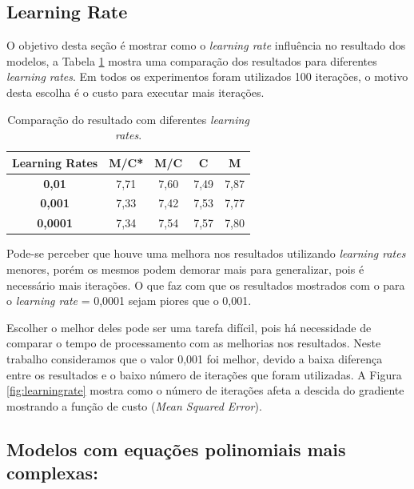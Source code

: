 \documentclass[conference]{IEEEtran}
\begin{document}
\subsection{Learning Rate}

O objetivo desta seção é mostrar como o \emph{learning rate} influência no resultado dos modelos, a Tabela \ref{tab:rates} mostra uma comparação dos resultados para diferentes \emph{learning rates}. Em todos os experimentos foram utilizados 100 iterações, o motivo desta escolha é o custo para executar mais iterações.

\begin{table}[!h]
	\centering
	
	\begin{tabular}{ccccc} \\ \hline
		\textbf{Learning Rates} & \textbf{M/C*} & \textbf{M/C} & \textbf{C} & \textbf{M} \\ \hline
		\textbf{0,01}   & 7,71          & 7,60         & 7,49       & 7,87       \\
		\textbf{0,001}  & 7,33          & 7,42         & 7,53       & 7,77       \\
		\textbf{0,0001} & 7,34          & 7,54         & 7,57       & 7,80       \\ \hline 
	\end{tabular}
	\caption{Comparação do resultado com diferentes \emph{learning rates}.}
	\label{tab:rates}
\end{table}

Pode-se perceber que houve uma melhora nos resultados utilizando \emph{learning rates} menores, porém os mesmos podem demorar mais para generalizar, pois é necessário mais iterações. O que faz com que os resultados mostrados com o para o \emph{learning rate} = 0,0001 sejam piores que o 0,001.

Escolher o melhor deles pode ser uma tarefa difícil, pois há necessidade de comparar o tempo de processamento com as melhorias nos resultados. Neste trabalho consideramos que o valor 0,001 foi melhor, devido a baixa diferença entre os resultados e o baixo número de iterações que foram utilizadas. A Figura \ref{fig:learningrate} mostra como o número de iterações afeta a descida do gradiente mostrando a função de custo (\emph{Mean Squared Error}).

\subsection{Modelos com equações polinomiais mais complexas: }
\end{document}
